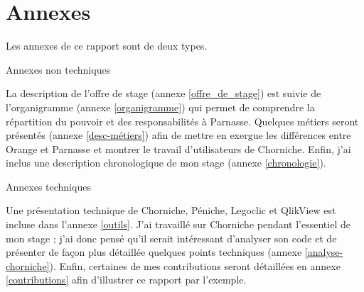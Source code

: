 
\part*{Annexes\label{annexes}}

Les annexes de ce rapport sont de deux types.

\subparagraph{Annexes non techniques} La description de l'offre de stage (annexe \ref{offre_de_stage}) est suivie de l'organigramme (annexe \ref{organigramme}) qui permet de comprendre la répartition du pouvoir et des responsabilités à Parnasse. Quelques métiers seront présentés (annexe \ref{desc-métiers}) afin de mettre en exergue les différences entre Orange et Parnasse et montrer le travail d'utilisateurs de Chorniche. Enfin, j'ai inclus une description chronologique de mon stage (annexe \ref{chronologie}).

\subparagraph{Annexes techniques} Une présentation technique de Chorniche, Péniche, Legoclic et QlikView est incluse dans l'annexe \ref{outils}. J'ai travaillé sur Chorniche pendant l'essentiel de mon stage ; j'ai donc pensé qu'il serait intéressant d'analyser son code et de présenter de façon plus détaillée quelques points techniques (annexe \ref{analyse-chorniche}). Enfin, certaines de mes contributions seront détaillées en annexe \ref{contributions} afin d'illustrer ce rapport par l'exemple.

